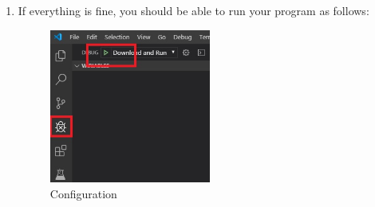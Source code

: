 \documentclass{scrartcl}
\begin{document}
\begin{enumerate}
    \newpage
    \item If everything is fine, you should be able to run your program as follows:
        \begin{figure}[h!]
            \begin{center}
              \includegraphics[width=0.5\textwidth]{run.jpg}
              \caption{Configuration}
            \end{center}
        \end{figure}
    

\end{enumerate}
\end{document}

